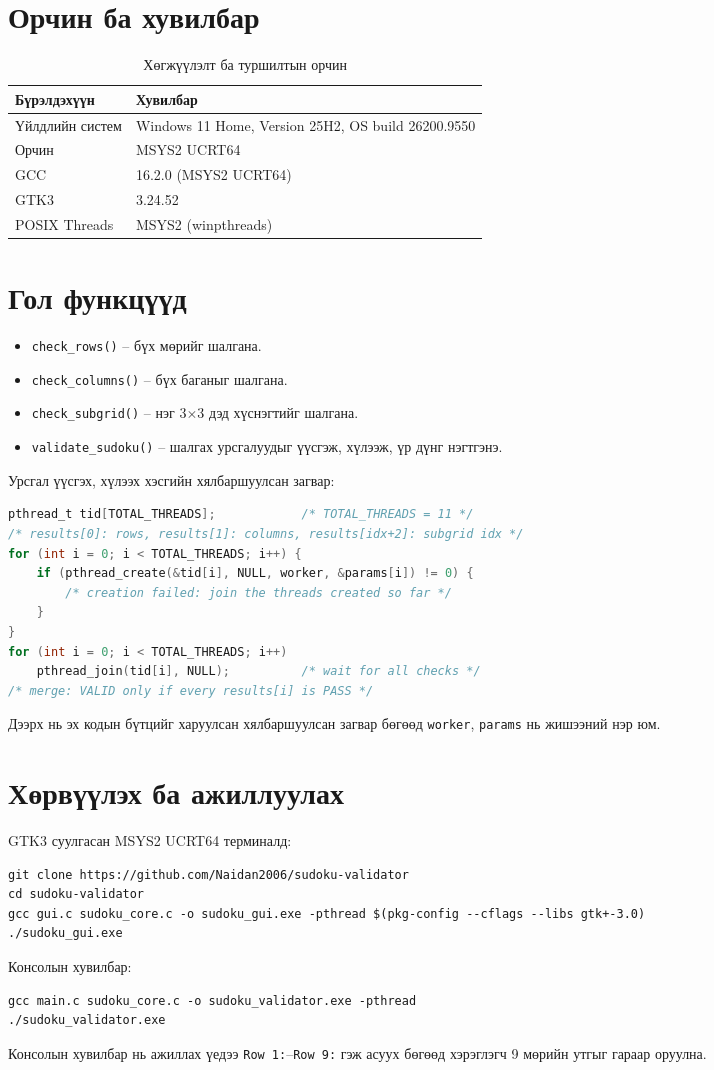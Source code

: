 \documentclass[12pt,a4paper]{report}
\begin{document}
\section{Орчин ба хувилбар}
\begin{table}[H]\centering\caption{Хөгжүүлэлт ба туршилтын орчин}\begin{tabular}{P{0.35\textwidth}P{0.55\textwidth}}\toprule
\textbf{Бүрэлдэхүүн}&\textbf{Хувилбар}\\\midrule
Үйлдлийн систем&Windows 11 Home, Version 25H2, OS build 26200.9550\\
Орчин&MSYS2 UCRT64\\
GCC&16.2.0 (MSYS2 UCRT64)\\
GTK3&3.24.52\\
POSIX Threads&MSYS2 (winpthreads)\\\bottomrule\end{tabular}\end{table}
\section{Гол функцүүд}
\begin{itemize}\item \texttt{check\_rows()} -- бүх мөрийг шалгана.\item \texttt{check\_columns()} -- бүх баганыг шалгана.\item \texttt{check\_subgrid()} -- нэг 3$\times$3 дэд хүснэгтийг шалгана.\item \texttt{validate\_sudoku()} -- шалгах урсгалуудыг үүсгэж, хүлээж, үр дүнг нэгтгэнэ.\end{itemize}
Урсгал үүсгэх, хүлээх хэсгийн хялбаршуулсан загвар:
\begin{lstlisting}[language=C]
pthread_t tid[TOTAL_THREADS];            /* TOTAL_THREADS = 11 */
/* results[0]: rows, results[1]: columns, results[idx+2]: subgrid idx */
for (int i = 0; i < TOTAL_THREADS; i++) {
    if (pthread_create(&tid[i], NULL, worker, &params[i]) != 0) {
        /* creation failed: join the threads created so far */
    }
}
for (int i = 0; i < TOTAL_THREADS; i++)
    pthread_join(tid[i], NULL);          /* wait for all checks */
/* merge: VALID only if every results[i] is PASS */
\end{lstlisting}
Дээрх нь эх кодын бүтцийг харуулсан хялбаршуулсан загвар бөгөөд \texttt{worker}, \texttt{params} нь жишээний нэр юм.
\section{Хөрвүүлэх ба ажиллуулах}
GTK3 суулгасан MSYS2 UCRT64 терминалд:
\begin{lstlisting}
git clone https://github.com/Naidan2006/sudoku-validator
cd sudoku-validator
gcc gui.c sudoku_core.c -o sudoku_gui.exe -pthread $(pkg-config --cflags --libs gtk+-3.0)
./sudoku_gui.exe
\end{lstlisting}
Консолын хувилбар:
\begin{lstlisting}
gcc main.c sudoku_core.c -o sudoku_validator.exe -pthread
./sudoku_validator.exe
\end{lstlisting}
Консолын хувилбар нь ажиллах үедээ \texttt{Row 1:}--\texttt{Row 9:} гэж асуух бөгөөд хэрэглэгч 9 мөрийн утгыг гараар оруулна.
\end{document}
